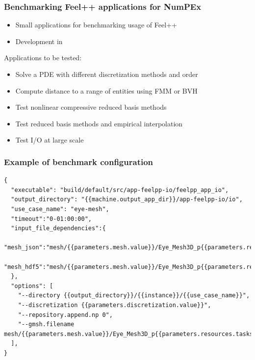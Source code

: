 \documentclass[aspectratio=169]{beamer}
\begin{document}
\begin{frame}
  \frametitle{Benchmarking Feel++ applications for NumPEx}

  \begin{itemize}
    \item Small applications for benchmarking usage of Feel++
    \item Development in 
  \end{itemize}

  \pause

  Applications to be tested:
  \begin{small}
  \begin{itemize}
    \item {} Solve a PDE with different discretization methods and order
    \item {} Compute distance to a range of entities using FMM or BVH
    \item {} Test nonlinear compressive reduced basis methods
    \item {} Test reduced basis methods and empirical interpolation
    \item {} Test I/O at large scale
  \end{itemize}
  \end{small}

\end{frame}


\begin{frame}[fragile]
  \frametitle{Example of benchmark configuration}

  \begin{lrbox}{\mintedbox}
  \begin{verbatim}
{
  "executable": "build/default/src/app-feelpp-io/feelpp_app_io",
  "output_directory": "{{machine.output_app_dir}}/app-feelpp-io/io",
  "use_case_name": "eye-mesh",
  "timeout":"0-01:00:00",
  "input_file_dependencies":{
      "mesh_json":"mesh/{{parameters.mesh.value}}/Eye_Mesh3D_p{{parameters.resources.tasks.value}}.json",
      "mesh_hdf5":"mesh/{{parameters.mesh.value}}/Eye_Mesh3D_p{{parameters.resources.tasks.value}}.h5"
  },
  "options": [
    "--directory {{output_directory}}/{{instance}}/{{use_case_name}}",
    "--discretization {{parameters.discretization.value}}",
    "--repository.append.np 0",
    "--gmsh.filename mesh/{{parameters.mesh.value}}/Eye_Mesh3D_p{{parameters.resources.tasks.value}}.json"
  ],
}
  \end{verbatim}
  \end{lrbox}

  \resizebox{\textwidth}{!}{\usebox{\mintedbox}}

\end{frame}
\end{document}
